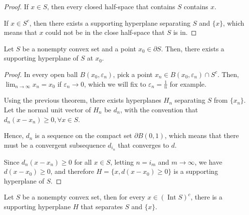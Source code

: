 \begin{proof}
  If \( x \in S \), then every closed half-space that contains \( S \) contains
  \( x \).

  If \( x \in S^{c} \), then there exists a supporting hyperplane separating \(
  S\) and \( \{x\}   \), which means that \( x \) could not be in the close
  half-space that \( S \) is in.
\end{proof}


\begin{theorem}
  \label{thr:sht-boundary}
  Let \( S \) be a nonempty convex set and a point \( x_{0} \in \partial S \).
  Then, there exists a supporting hyperplane of \( S \) at \( x_{0} \).
\end{theorem}

\begin{proof}
  In every open ball \( B(x_{0}, \varepsilon_{n}) \), pick a point \( x_{n} \in
  B(x_{0}, \varepsilon_{n}) \cap  S^{c}\). Then, \( \lim_{n \to \infty} x_{n} =
  x_{0}\) if \( \varepsilon_{n} \to  0 \), which we will fix to \( \varepsilon_{n}
  = \frac{1}{n}\) for example.

  Using the previous theorem, there exists hyperplanes \( H_{n} \) separating \(
  S\) from \( \{x_{n}\}   \). Let the normal unit vector of \( H_{n} \) be \(
  d_{n} \), with the convention that \( d_{n}(x-x_{n}) \ge 0, \forall  x \in
  S \).

  Hence, \( d_{n} \) is a sequence on the compact set \( \partial B(0, 1) \),
  which means that there must be a convergent subsequence \( d_{i_{n}} \) that
  converges to \( d \).

  Since \( d_{n}(x-x_{n}) \ge 0 \) for all \( x \in S \), letting \( n = i_{m}
  \) and \( m \to  \infty \), we have \( d(x-x_{0}) \ge 0 \), and therefore \(
  H=\{x, d(x-x_{0})\ge 0\}   \) is a supporting hyperplane of \( S \).
\end{proof}

\begin{corollary}
\label{cor:hst-set-pt}
  Let \( S \) be a nonempty convex set, then for every \( x \in
  (\operatorname{Int} S)^{c} \), there is a supporting hyperplane \( H \) that
  separates \( S \) and \( \{ x\}   \).
\end{corollary}

